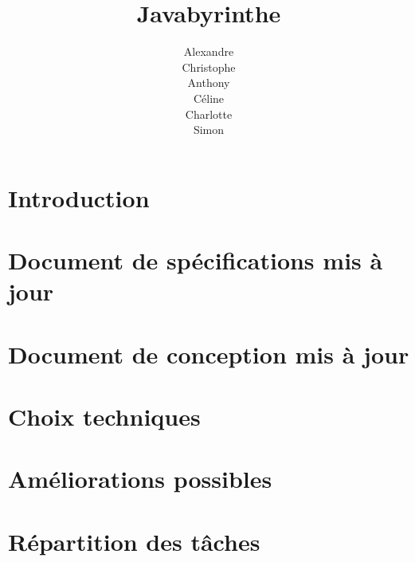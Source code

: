 \documentclass{scrreprt}
\title{Javabyrinthe}
\author{Alexandre \bsc{Brehmer}\\ Christophe \bsc{Cluizel} \\ Anthony \bsc{Courtin} \\ Céline \bsc{Leduc} \\ Charlotte \bsc{Touchard} \\ Simon \bsc{Wallon}}
\begin{document}

\tableofcontents

\chapter*{Introduction}
	
	
\chapter{Document de spécifications mis à jour}
	
	
\chapter{Document de conception mis à jour}
	

\chapter{Choix techniques}
	

\chapter{Améliorations possibles}
	

\chapter{Répartition des tâches}
	
\end{document}
